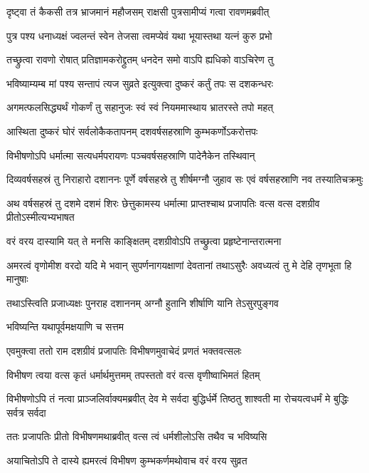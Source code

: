 \twolineshloka
{दृष्ट्वा तं कैकसी तत्र भ्राजमानं महौजसम्}
{राक्षसी पुत्रसामीप्यं गत्वा रावणमब्रवीत्} %

\twolineshloka
{पुत्र पश्य धनाध्यक्षं ज्वलन्तं स्वेन तेजसा}
{त्वमप्येवं यथा भूयास्तथा यत्नं कुरु प्रभो} %

\twolineshloka
{तच्छ्रुत्वा रावणो रोषात् प्रतिज्ञामकरोद्द्रुतम्}
{धनदेन समो वाऽपि ह्यधिको वाऽचिरेण तु} %

\twolineshloka
{भविष्याम्यम्ब मां पश्य सन्तापं त्यज सुव्रते}
{इत्युक्त्वा दुष्करं कर्तुं तपः स दशकन्धरः} %

\twolineshloka
{अगमत्फलसिद्ध्यर्थं गोकर्णं तु सहानुजः}
{स्वं स्वं नियममास्थाय भ्रातरस्ते तपो महत्} %

\twolineshloka
{आस्थिता दुष्करं घोरं सर्वलोकैकतापनम्}
{दशवर्षसहस्राणि कुम्भकर्णोऽकरोत्तपः} %

\twolineshloka
{विभीषणोऽपि धर्मात्मा सत्यधर्मपरायणः}
{पञ्चवर्षसहस्राणि पादेनैकेन तस्थिवान्} %

\threelineshloka
{दिव्यवर्षसहस्रं तु निराहारो दशाननः}
{पूर्णे वर्षसहस्रे तु शीर्षमग्नौ जुहाव सः}
{एवं वर्षसहस्राणि नव तस्यातिचक्रमुः} %

\threelineshloka
{अथ वर्षसहस्रं तु दशमे दशमं शिरः}
{छेत्तुकामस्य धर्मात्मा प्राप्तश्चाथ प्रजापतिः}
{वत्स वत्स दशग्रीव प्रीतोऽस्मीत्यभ्यभाषत} %

\twolineshloka
{वरं वरय दास्यामि यत् ते मनसि काङ्क्षितम्}
{दशग्रीवोऽपि तच्छ्रुत्वा प्रहृष्टेनान्तरात्मना} %

\threelineshloka
{अमरत्वं वृणोमीश वरदो यदि मे भवान्}
{सुपर्णनागयक्षाणां देवतानां तथाऽसुरैः}
{अवध्यत्वं तु मे देहि तृणभूता हि मानुषाः} %

\twolineshloka
{तथाऽस्त्विति प्रजाध्यक्षः पुनराह दशाननम्}
{अग्नौ हुतानि शीर्षाणि यानि तेऽसुरपुङ्गव} %

\onelineshloka
{भविष्यन्ति यथापूर्वमक्षयाणि च सत्तम} %

\twolineshloka
{एवमुक्त्वा ततो राम दशग्रीवं प्रजापतिः}
{विभीषणमुवाचेदं प्रणतं भक्तवत्सलः} %

\twolineshloka
{विभीषण त्वया वत्स कृतं धर्मार्थमुत्तमम्}
{तपस्ततो वरं वत्स वृणीष्वाभिमतं हितम्} %

\threelineshloka
{विभीषणोऽपि तं नत्वा प्राञ्जलिर्वाक्यमब्रवीत्}
{देव मे सर्वदा बुद्धिर्धर्मे तिष्ठतु शाश्वती}
{मा रोचयत्वधर्मं मे बुद्धिः सर्वत्र सर्वदा} %

\twolineshloka
{ततः प्रजापतिः प्रीतो विभीषणमथाब्रवीत्}
{वत्स त्वं धर्मशीलोऽसि तथैव च भविष्यसि} %

\twolineshloka
{अयाचितोऽपि ते दास्ये ह्यमरत्वं विभीषण}
{कुम्भकर्णमथोवाच वरं वरय सुव्रत} %

